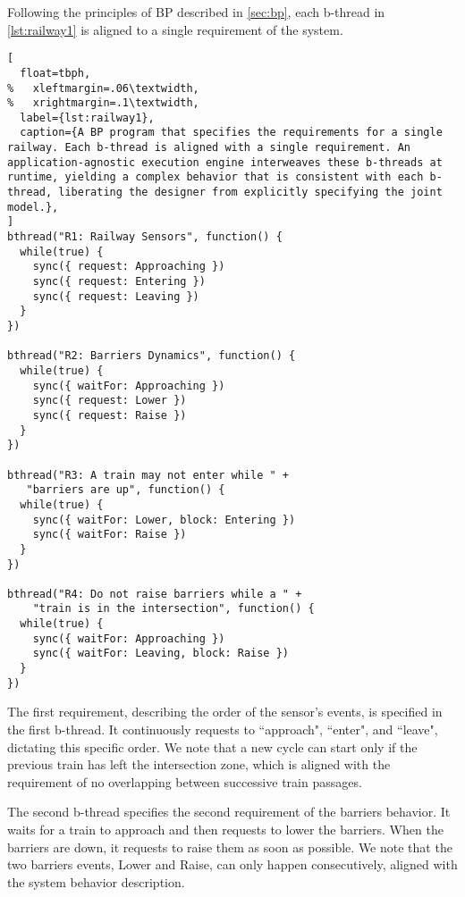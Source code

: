 \documentclass[10pt,journal,compsoc]{IEEEtran}
\theoremstyle{definition}
\begin{document}
Following the principles of BP described in \autoref{sec:bp}, each b-thread in \autoref{lst:railway1} is aligned to a single requirement of the system. 

\begin{lstlisting}[
  float=tbph,
%   xleftmargin=.06\textwidth,
%   xrightmargin=.1\textwidth,
  label={lst:railway1},
  caption={A BP program that specifies the requirements for a single railway. Each b-thread is aligned with a single requirement. An application-agnostic execution engine interweaves these b-threads at runtime, yielding a complex behavior that is consistent with each b-thread, liberating the designer from explicitly specifying the joint model.},
]
bthread("R1: Railway Sensors", function() {
  while(true) {
    sync({ request: Approaching })
    sync({ request: Entering })
    sync({ request: Leaving })
  }
})

bthread("R2: Barriers Dynamics", function() {
  while(true) {
    sync({ waitFor: Approaching })
    sync({ request: Lower })
    sync({ request: Raise })
  }
})

bthread("R3: A train may not enter while " +
   "barriers are up", function() {
  while(true) {
    sync({ waitFor: Lower, block: Entering })
    sync({ waitFor: Raise })
  }
})

bthread("R4: Do not raise barriers while a " +
    "train is in the intersection", function() {
  while(true) {
    sync({ waitFor: Approaching })
    sync({ waitFor: Leaving, block: Raise })
  }
})
\end{lstlisting}

The first requirement, describing the order of the sensor's events, is specified in the first b-thread. It continuously requests to ``approach", ``enter", and ``leave", dictating this specific order. We note that a new cycle can start only if the previous train has left the intersection zone, which is aligned with the requirement of no overlapping between successive train passages.

The second b-thread specifies the second requirement of the barriers behavior. It waits for a train to approach and then requests to lower the barriers. When the barriers are down, it requests to raise them as soon as possible. We note that the two barriers events, Lower and Raise, can only happen consecutively, aligned with the system behavior description. 
\end{document}
